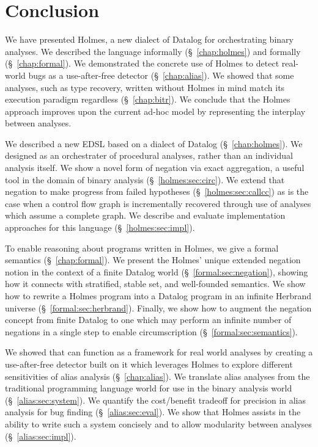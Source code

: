 \chapter{Conclusion}
\label{sec:conc}
We have presented Holmes, a new dialect of Datalog for orchestrating binary analyses.
We described the language informally (\S~\ref{chap:holmes}) and formally (\S~\ref{chap:formal}).
We demonstrated the concrete use of Holmes to detect real-world bugs as a use-after-free detector (\S~\ref{chap:alias}).
We showed that some analyses, such as type recovery, written without Holmes in mind match its execution paradigm regardless (\S~\ref{chap:bitr}).
We conclude that the Holmes approach improves upon the current ad-hoc model by representing the interplay between analyses.

We described a new EDSL based on a dialect of Datalog (\S~\ref{chap:holmes}).
We designed {\sysname} as an orchestrater of procedural analyses, rather than an individual analysis itself.
We show a novel form of negation via exact aggregation, a useful tool in the domain of binary analysis (\S~\ref{holmes:sec:circ}).
We extend that negation to make progress from failed hypotheses (\S~\ref{holmes:sec:callcc}) as is the case when a control flow graph is incrementally recovered through use of analyses which assume a complete graph.
We describe and evaluate implementation approaches for this language (\S~\ref{holmes:sec:impl}).

To enable reasoning about programs written in Holmes, we give a formal semantics (\S~\ref{chap:formal}).
We present the Holmes' unique extended negation notion in the context of a finite Datalog world (\S~\ref{formal:sec:negation}), showing how it connects with stratified, stable set, and well-founded semantics. 
We show how to rewrite a Holmes program into a Datalog program in an infinite Herbrand universe (\S~\ref{formal:sec:herbrand}).
Finally, we show how to augment the negation concept from finite Datalog to one which may perform an infinite number of negations in a single step to enable circumscription (\S~\ref{formal:sec:semantics}).

We showed that {\sysname} can function as a framework for real world analyses by creating a use-after-free detector built on it which leverages Holmes to explore different sensitivities of alias analysis (\S~\ref{chap:alias}).
We translate alias analyses from the traditional programming language world for use in the binary analysis world (\S~\ref{alias:sec:system}).
We quantify the cost/benefit tradeoff for precision in alias analysis for bug finding (\S~\ref{alias:sec:eval}).
We show that Holmes assists in the ability to write such a system concisely and to allow modularity between analyses (\S~\ref{alias:sec:impl}).

